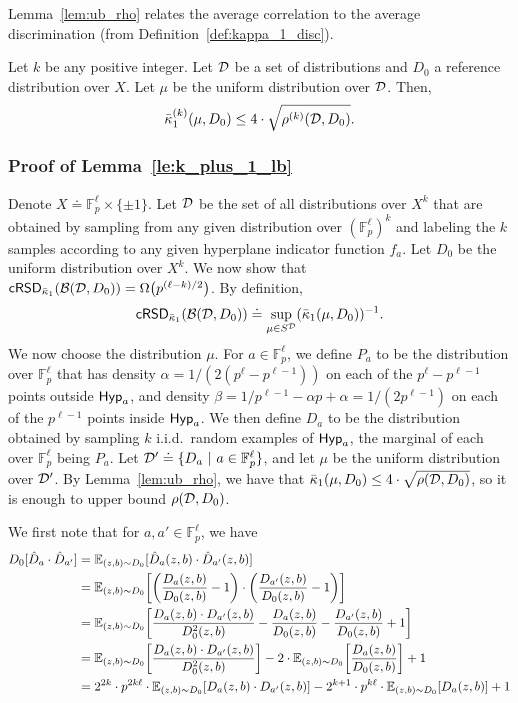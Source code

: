 Lemma~\ref{lem:ub_rho} relates the average correlation to the average discrimination (from Definition~\ref{def:kappa_1_disc}).
\begin{lem}\label{lem:ub_rho}
Let $k$ be any positive integer. Let $\mathcal{D}$ be a set of distributions and $D_0$ a reference distribution over $X$. Let $\mu$ be the uniform distribution over $\mathcal{D}$. Then,
$$ \bar{\kappa}_1^{(k)}(\mu,D_0) \le 4 \cdot \sqrt{\rho^{(k)}(\mathcal{D},D_0)}. $$
\end{lem}



\subsubsection{Proof of Lemma~\ref{le:k_plus_1_lb}}\label{subsec:sep_lb}

Denote $X \doteq \mathbb{F}_p^{\ell} \times \{\pm 1\}$. Let $\mathcal{D}$ be the set of all distributions over $X^k$ that are obtained by sampling from any given distribution over $(\mathbb{F}_p^{\ell})^k$ and labeling the $k$ samples according to any given hyperplane indicator function $f_a$. Let $D_0$ be the uniform distribution over $X^k$. We now show that $\mathsf{cRSD}_{\bar{\kappa}_1}(\mathcal{B}(\mathcal{D},D_0)) = \Omega\big(p^{(\ell-k)/2}\big)$. By definition,
$$ \mathsf{cRSD}_{\bar{\kappa}_1}(\mathcal{B}(\mathcal{D},D_0)) \doteq \sup_{\mu \in S^{\mathcal{D}}} (\bar{\kappa}_1(\mu,D_0))^{-1}. $$
We now choose the distribution $\mu$. For $a \in \mathbb{F}_p^{\ell}$, we define $P_a$ to be the distribution over $\mathbb{F}_p^{\ell}$ that has density $\alpha = 1/(2 (p^{\ell}-p^{\ell-1}))$ on each of the $p^{\ell}-p^{\ell-1}$ points outside $\mathsf{Hyp}_a$, and density $\beta = 1/p^{\ell-1}-\alpha p +\alpha = 1/(2p^{\ell-1})$ on each of the $p^{\ell-1}$ points inside $\mathsf{Hyp}_a$. We then define $D_a$ to be the distribution obtained by sampling $k$ i.i.d.~random examples of $\mathsf{Hyp}_a$, the marginal of each over $\mathbb{F}_p^{\ell}$ being $P_a$. Let $\mathcal{D}' \doteq \{D_a ~ | ~ a \in \mathbb{F}_p^{\ell}\}$, and let $\mu$ be the uniform distribution over $\mathcal{D}'$. By Lemma~\ref{lem:ub_rho}, we have that $\bar{\kappa}_1(\mu,D_0) \le 4 \cdot \sqrt{\rho(\mathcal{D},D_0)}$, so it is enough to upper bound $\rho(\mathcal{D},D_0)$.

We first note that for $a, a' \in \mathbb{F}_p^{\ell}$, we have
\begin{align*}
D_0[\hat{D}_a \cdot \hat{D}_{a'}] &= \mathbb E_{(z,b) \sim D_0} [ \hat{D}_a(z,b) \cdot \hat{D}_{a'}(z,b)]\\
&= \mathbb E_{(z,b) \sim D_0} \bigg[ \bigg(\frac{D_a(z,b)}{D_0(z,b)}-1 \bigg) \cdot \bigg(\frac{D_{a'}(z,b)}{D_0(z,b)}-1\bigg)\bigg]\\
&= \mathbb E_{(z,b) \sim D_0} \bigg[ \frac{D_a(z,b) \cdot D_{a'}(z,b)}{D_0^2(z,b)} - \frac{D_a(z,b)}{D_0(z,b)} - \frac{D_{a'}(z,b)}{D_0(z,b)} +1\bigg]\\
&= \mathbb E_{(z,b) \sim D_0} \bigg[ \frac{D_a(z,b) \cdot D_{a'}(z,b)}{D_0^2(z,b)}\bigg] - 2 \cdot \mathbb E_{(z,b) \sim D_0} \bigg[\frac{D_a(z,b)}{D_0(z,b)}\bigg] +1\\
&= 2^{2k} \cdot p^{2 k \ell} \cdot \mathbb E_{(z,b) \sim D_0}[D_a(z,b) \cdot D_{a'}(z,b)] - 2^{k+1} \cdot p^{k \ell} \cdot \mathbb E_{(z,b) \sim D_0}[D_a(z,b)] + 1
\end{align*}

